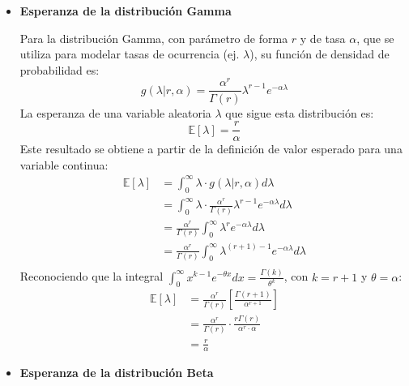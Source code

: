 \documentclass[
]{book}
\begin{document}
\begin{itemize}
\item
  \textbf{Esperanza de la distribución Gamma}

  Para la distribución Gamma, con parámetro de forma \(r\) y de tasa
  \(\alpha\), que se utiliza para modelar tasas de ocurrencia (ej.
  \(\lambda\)), su función de densidad de probabilidad es:
  \[g(\lambda|r,\alpha) = \frac{\alpha^r}{\Gamma(r)} \lambda^{r-1} e^{-\alpha\lambda}\]
  La esperanza de una variable aleatoria \(\lambda\) que sigue esta
  distribución es: \[
  \mathbb{E}[\lambda] = \frac{r}{\alpha}
  \]Este resultado se obtiene a partir de la definición de valor
  esperado para una variable continua: \[
  \begin{aligned}
  \mathbb{E}[\lambda] &= \int_{0}^{\infty} \lambda \cdot g(\lambda|r,\alpha) d\lambda \\
  &= \int_{0}^{\infty} \lambda \cdot \frac{\alpha^r}{\Gamma(r)} \lambda^{r-1} e^{-\alpha\lambda} d\lambda \\
  &= \frac{\alpha^r}{\Gamma(r)} \int_{0}^{\infty} \lambda^{r} e^{-\alpha\lambda} d\lambda \\
  &= \frac{\alpha^r}{\Gamma(r)} \int_{0}^{\infty} \lambda^{(r+1)-1} e^{-\alpha\lambda} d\lambda \\
  \end{aligned}
  \] Reconociendo que la integral
  \(\int_{0}^{\infty} x^{k-1}e^{-\theta x}dx = \frac{\Gamma(k)}{\theta^k}\),
  con \(k=r+1\) y \(\theta=\alpha\): \[
  \begin{aligned}
  \mathbb{E}[\lambda] &= \frac{\alpha^r}{\Gamma(r)} \left[ \frac{\Gamma(r+1)}{\alpha^{r+1}} \right] \\
  &= \frac{\alpha^r}{\Gamma(r)} \cdot \frac{r\Gamma(r)}{\alpha^r \cdot \alpha} \\
  &= \frac{r}{\alpha}
  \end{aligned}
  \]
\item
  \textbf{Esperanza de la distribución Beta}


\end{itemize}
\end{document}
